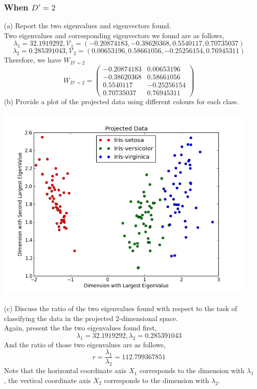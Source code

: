 \documentclass[11pt,a4paper]{article}
\newcommand{\htab}{\hspace*{0.63cm}}
\newcommand{\V}{\mathcal{V}}
\begin{document}
\subsubsection{When $D' = 2$}
(a) Report the two eigenvalues and eigenvectors found. \\
\htab Two eigenvalues and corresponding eigenvectors we found are as follows,
    $$ \lambda_{1} = 32.1919292, 
    \V_{1} = (-0.20874183, -0.38620368,  0.5540117, 0.70735037)  $$
    $$ \lambda_{2} = 0.285391043, 
    \V_{2} = (0.00653196,  0.58661056, -0.25256154,  0.76945311) $$
\htab Therefore, we have $W_{D'=2}$
$$ W_{D'=2} = \begin{pmatrix}
    -0.20874183 & 0.00653196  \\
    -0.38620368 & 0.58661056  \\
    0.5540117 & -0.25256154 \\
    0.70735037 &  0.76945311
   \end{pmatrix} $$
(b) Provide a plot of the projected data using different colours for each class.
\begin{center}
    \includegraphics[width=5in,height=3.8in]{./figure_1.png}
\end{center}
(c) Discuss the ratio of the two eigenvalues found with respect to the task of classifying the data in the projected 2-dimensional space. \\
\htab Again, present the the two eigenvalues found first,
    $$ \lambda_{1} = 32.1919292,  \lambda_{2} = 0.285391043 $$
\htab And the ratio of those two eigenvalues are as follows,
    $$ r = \frac{\lambda_{1}}{\lambda_{2}} = 112.799367851 $$
    \htab Note that the horizontal coordinate axis $X_{1}$ corresponds to the dimension with $\lambda_{1}$, the vertical coordinate axis $X_{2}$ corresponds to the dimension with $\lambda_{2}$. \\
\end{document}
